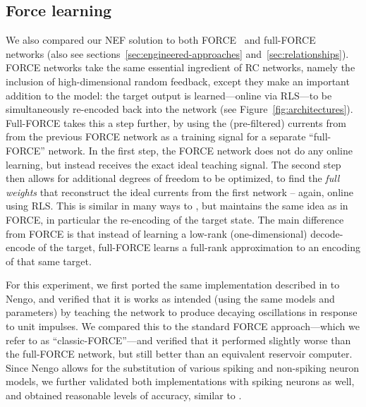 
\subsection{Force learning}
\label{sec:force-comparison}

We also compared our NEF solution to both FORCE~\citep{sussillo2009generating} and full-FORCE~\citep{depasquale2018full} networks (also see sections~\ref{sec:engineered-approaches} and~\ref{sec:relationships}).
FORCE networks take the same essential ingredient of RC networks, namely the inclusion of high-dimensional random feedback, except they make an important addition to the model: the target output is learned---online via RLS---to be simultaneously re-encoded back into the network (see Figure~\ref{fig:architectures}).
Full-FORCE takes this a step further, by using the (pre-filtered) currents from from the previous FORCE network as a training signal for a separate ``full-FORCE'' network. 
In the first step, the FORCE network does not do any online learning, but instead receives the exact ideal teaching signal.
The second step then allows for additional degrees of freedom to be optimized, to find the \emph{full weights} that reconstruct the ideal currents from the first network -- again, online using RLS.
This is similar in many ways to \citet{tripp2006neural}, but maintains the same idea as in FORCE, in particular the re-encoding of the target state.
The main difference from FORCE is that instead of learning a low-rank (one-dimensional) decode-encode of the target, full-FORCE learns a full-rank approximation to an encoding of that same target.

For this experiment, we first ported the same implementation described in \citet{depasquale2018full} to Nengo, and verified that it is works as intended (using the same models and parameters) by teaching the network to produce decaying oscillations in response to unit impulses.
We compared this to the standard FORCE approach---which we refer to as ``classic-FORCE''---and verified that it performed slightly worse than the full-FORCE network, but still better than an equivalent reservoir computer.
Since Nengo allows for the substitution of various spiking and non-spiking neuron models, we further validated both implementations with spiking neurons as well, and obtained reasonable levels of accuracy, similar to \citet{depasquale2016using, thalmeier2016learning, nicola2016supervised}.

